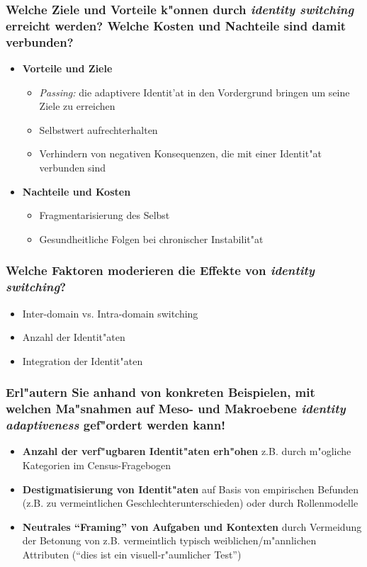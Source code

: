 \subsubsection{Welche Ziele und Vorteile k"onnen durch \emph{identity switching} erreicht werden? Welche Kosten und Nachteile sind damit verbunden?}

\begin{itemize}
        \item \textbf{Vorteile und Ziele}
                \begin{itemize}
                        \item \emph{Passing:} die adaptivere Identit'at in den Vordergrund bringen um seine Ziele zu erreichen
                        \item Selbstwert aufrechterhalten
                        \item Verhindern von negativen Konsequenzen, die mit einer Identit"at verbunden sind
                \end{itemize}
        \item \textbf{Nachteile und Kosten}
                \begin{itemize}
                        \item Fragmentarisierung des Selbst
                        \item Gesundheitliche Folgen bei chronischer Instabilit"at
                \end{itemize}
\end{itemize}

\subsubsection{Welche Faktoren moderieren die Effekte von \emph{identity switching}?}
\begin{itemize}
        \item Inter-domain vs. Intra-domain switching
        \item Anzahl der Identit"aten
        \item Integration der Identit"aten
\end{itemize}

\subsubsection{Erl"autern Sie anhand von konkreten Beispielen, mit welchen Ma"snahmen auf Meso- und Makroebene \emph{identity adaptiveness} gef"ordert werden kann!}
\begin{itemize}
        \item \textbf{Anzahl der verf"ugbaren Identit"aten erh"ohen} z.B. durch m"ogliche Kategorien im Census-Fragebogen
        \item \textbf{Destigmatisierung von Identit"aten} auf Basis von empirischen Befunden (z.B. zu vermeintlichen Geschlechterunterschieden) oder durch Rollenmodelle 
        \item \textbf{Neutrales ``Framing'' von Aufgaben und Kontexten} durch Vermeidung der Betonung von z.B. vermeintlich typisch weiblichen/m"annlichen Attributen (``dies ist ein visuell-r"aumlicher Test'')
\end{itemize}

